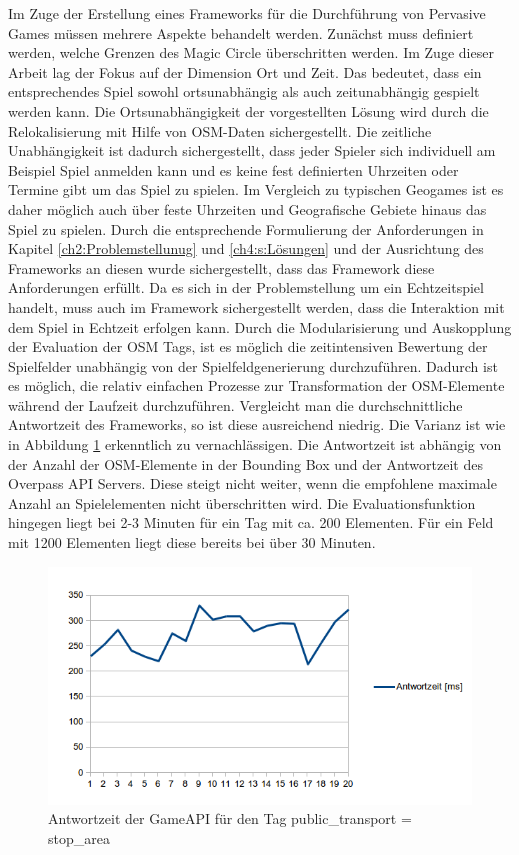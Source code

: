 Im Zuge der Erstellung eines Frameworks für die Durchführung von Pervasive Games müssen mehrere Aspekte behandelt werden. Zunächst muss definiert werden, welche Grenzen des Magic Circle überschritten werden. Im Zuge dieser Arbeit lag der Fokus auf der Dimension Ort und Zeit. Das bedeutet, dass ein entsprechendes Spiel sowohl ortsunabhängig als auch zeitunabhängig gespielt werden kann. Die Ortsunabhängigkeit der vorgestellten Lösung wird durch die Relokalisierung mit Hilfe von OSM-Daten sichergestellt. Die zeitliche Unabhängigkeit ist dadurch sichergestellt, dass jeder Spieler sich individuell am Beispiel Spiel anmelden kann und es keine fest definierten Uhrzeiten oder Termine gibt um das Spiel zu spielen. Im Vergleich zu typischen Geogames ist es daher möglich auch über feste Uhrzeiten und Geografische Gebiete hinaus das Spiel zu spielen. Durch die entsprechende Formulierung der Anforderungen in Kapitel \ref{ch2:Problemstellunug} und \ref{ch4:s:Lösungen} und der Ausrichtung des Frameworks an diesen wurde sichergestellt, dass das Framework diese Anforderungen erfüllt. Da es sich in der Problemstellung um ein Echtzeitspiel handelt, muss auch im Framework sichergestellt werden, dass die Interaktion mit dem Spiel in Echtzeit erfolgen kann.
Durch die Modularisierung und Auskopplung der Evaluation der OSM Tags, ist es möglich die zeitintensiven Bewertung der Spielfelder unabhängig von der Spielfeldgenerierung durchzuführen. Dadurch ist es möglich, die relativ einfachen Prozesse zur Transformation der OSM-Elemente während der Laufzeit durchzuführen. Vergleicht man die durchschnittliche Antwortzeit des Frameworks, so ist diese ausreichend niedrig. Die Varianz ist wie in Abbildung \ref{img:ch6_img01_response_time} erkenntlich zu vernachlässigen.  Die Antwortzeit ist  abhängig von der Anzahl der OSM-Elemente in der Bounding Box und der Antwortzeit des Overpass API Servers. Diese steigt nicht weiter, wenn die empfohlene maximale Anzahl an Spielelementen nicht überschritten wird. Die Evaluationsfunktion hingegen liegt bei 2-3 Minuten für ein Tag mit ca. 200 Elementen. Für ein Feld mit 1200 Elementen liegt diese bereits bei über 30 Minuten.

\begin{figure}[H]
\begin{center}
\includegraphics[width=150mm]{images/ch6_img01_response_time.png}
\caption{Antwortzeit der GameAPI für den Tag public\_transport = stop\_area}
\label{img:ch6_img01_response_time}
\end{center}
\end{figure}

